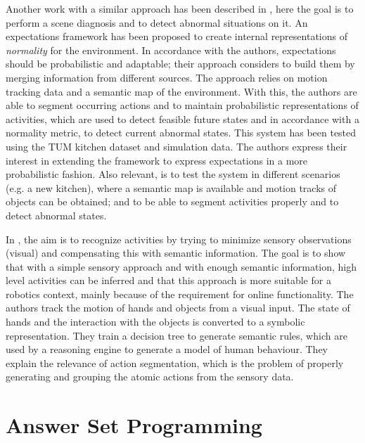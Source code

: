 Another work with a similar approach has been described in \citep{karg13expectations,karg13simultaneous,karg11towards,karg12acquisition}, here the goal is to perform a scene diagnosis and to detect abnormal situations on it.
An expectations framework has been proposed to create internal representations of \textit{normality} for the environment.
In accordance with the authors, expectations should be probabilistic and adaptable; their approach considers to build them by merging information from different sources.
The approach relies on motion tracking data and a semantic map of the environment.
With this, the authors are able to segment occurring actions and to maintain probabilistic representations of activities, which are used to detect feasible future states and in accordance with a normality metric, to detect current abnormal states.
This system has been tested using the TUM kitchen dataset \citep{Tenorth2009_TUMKData} and simulation data.
The authors express their interest in extending the framework to express expectations in a more probabilistic fashion.
Also relevant, is to test the system in different scenarios (e.g. a new kitchen), where a semantic map is available and motion tracks of objects can be obtained; and to be able to segment activities properly and to detect abnormal states.

In \citep{ramirez14Iros}, the aim is to recognize activities by trying to minimize sensory observations (visual) and compensating this with semantic information. 
The goal is to show that with a simple sensory approach and with enough semantic information, high level activities can be inferred and that this approach is more suitable for a robotics context, mainly because of the requirement for online functionality.
The authors track the motion of hands and objects from a visual input. 
The state of hands and the interaction with the objects is converted to a symbolic representation.
They train a decision tree to generate semantic rules, which are used by a reasoning engine to generate a model of human behaviour.
They explain the relevance of action segmentation, which is the problem of properly generating and grouping the atomic actions from the sensory data.









\section{Answer Set Programming} %

